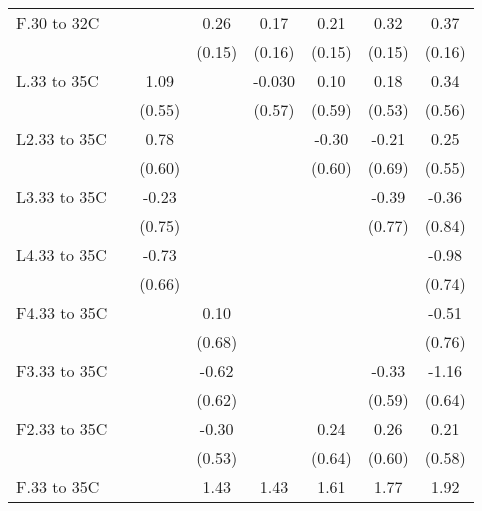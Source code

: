 \documentclass[paper=letterpaper, fontsize=11pt]{article} %
\begin{document}
{\begin{landscape}
\begin{longtable}{l*{7}{c}}
F.30 to 32C         &            &            &        0.26&        0.17&        0.21&        0.32&        0.37\\
                    &            &            &      (0.15)&      (0.16)&      (0.15)&      (0.15)&      (0.16)\\
L.33 to 35C         &            &        1.09&            &      -0.030&        0.10&        0.18&        0.34\\
                    &            &      (0.55)&            &      (0.57)&      (0.59)&      (0.53)&      (0.56)\\
L2.33 to 35C        &            &        0.78&            &            &       -0.30&       -0.21&        0.25\\
                    &            &      (0.60)&            &            &      (0.60)&      (0.69)&      (0.55)\\
L3.33 to 35C        &            &       -0.23&            &            &            &       -0.39&       -0.36\\
                    &            &      (0.75)&            &            &            &      (0.77)&      (0.84)\\
L4.33 to 35C        &            &       -0.73&            &            &            &            &       -0.98\\
                    &            &      (0.66)&            &            &            &            &      (0.74)\\
F4.33 to 35C        &            &            &        0.10&            &            &            &       -0.51\\
                    &            &            &      (0.68)&            &            &            &      (0.76)\\
F3.33 to 35C        &            &            &       -0.62&            &            &       -0.33&       -1.16\\
                    &            &            &      (0.62)&            &            &      (0.59)&      (0.64)\\
F2.33 to 35C        &            &            &       -0.30&            &        0.24&        0.26&        0.21\\
                    &            &            &      (0.53)&            &      (0.64)&      (0.60)&      (0.58)\\
F.33 to 35C         &            &            &        1.43&        1.43&        1.61&        1.77&        1.92\\

\end{longtable}
\end{landscape}}
\end{document}
